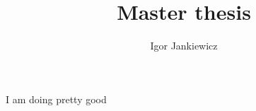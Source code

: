 \documentclass[10pt,a4paper,titlepage]{report}
\author{Igor Jankiewicz}
\title{Master thesis}
\begin{document}
I am doing pretty good
\end{document}
